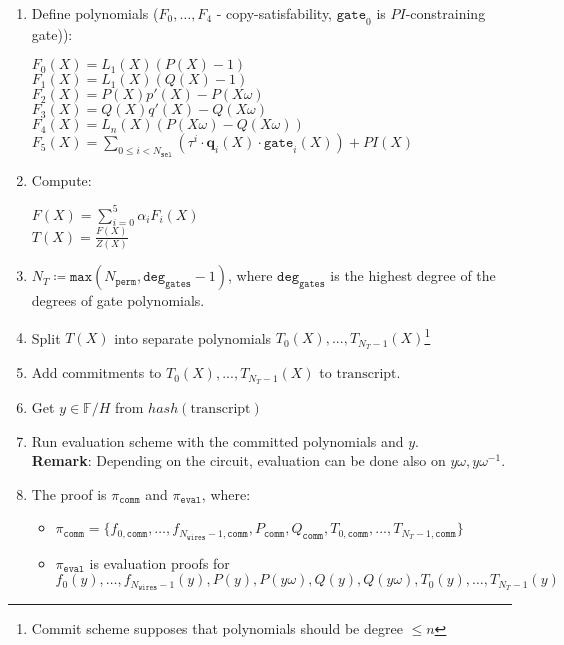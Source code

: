 \begin{enumerate}
    \item Define polynomials ($F_0, \dots, F_4$ - copy-satisfability, $\texttt{gate}_0$ is $PI$-constraining gate)):
    \begin{center}
        $F_0(X) = L_1(X)(P(X) - 1)$\\
        $F_1(X) = L_1(X)(Q(X) - 1)$ \\
        $F_2(X) = P(X)p'(X) - P(X\omega)$ \\
        $F_3(X) = Q(X)q'(X) - Q(X\omega)$ \\
        $F_4(X) = L_n(X)(P(X\omega) - Q(X\omega))$ \\
        $F_5(X) = \sum\limits_{0 \leq i < N_{\texttt{sel}}} (\tau^i \cdot \textbf{q}_{i}(X) \cdot \texttt{gate}_i(X))
        + PI(X)$
    \end{center}
    \item Compute:
    \begin{center}
        $F(X) = \sum\limits_{i = 0}^5 \alpha_iF_i(X)$ \\
        $T(X) = \frac{F(X)}{Z(X)}$
    \end{center}
    \item $N_T \coloneqq \texttt{max}(N_{\texttt{perm}}, \texttt{deg}_{\texttt{gates}} - 1)$, 
		where $\texttt{deg}_{\texttt{gates}}$ is the highest degree of the degrees of gate polynomials. 
    \item Split $T(X)$ into separate polynomials $T_0(X), ..., T_{N_T - 1}(X)$\footnote{
    	Commit scheme supposes that polynomials should be degree $\leq n$}
    \item Add commitments to $T_0(X), ..., T_{N_T - 1}(X)$ to $\text{transcript}$.
    \item Get $y \in \mathbb{F}/H$ from $hash(\text{transcript})$
    \item Run evaluation scheme with the committed polynomials and $y$. \\
    \textbf{Remark}: Depending on the circuit, evaluation can be done also on $y\omega, y\omega^{-1}$.
    \item The proof is $\pi_{\texttt{comm}}$ and $\pi_{\texttt{eval}}$, where:
    \begin{itemize}
        \item $\pi_{\texttt{comm}} = \{f_{0, \texttt{comm}}, \dots, f_{N_{\texttt{wires}} - 1, \texttt{comm}},
        P_{\texttt{comm}}, Q_{\texttt{comm}}, T_{0, \texttt{comm}}, ..., T_{N_T - 1, \texttt{comm}} \}$
        \item  $\pi_{\texttt{eval}}$ is evaluation proofs for $f_0(y), \dots, f_{N_{\texttt{wires}} - 1}(y), P(y), P(y\omega), Q(y), Q(y\omega), T_0(y), \dots, T_{N_T - 1}(y)$
    \end{itemize}
\end{enumerate}

